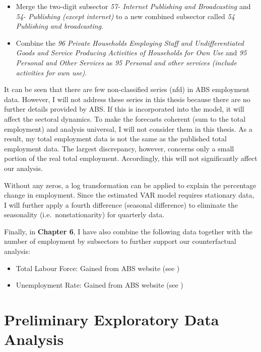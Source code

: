 \documentclass{monashthesis}
\begin{document}
\begin{itemize}
\item
  Merge the two-digit subsector \emph{57- Internet Publishing and Broadcasting} and \emph{54- Publishing (except internet)} to a new combined subsector called \emph{54 Publishing and broadcasting}.
\item
  Combine the \emph{96 Private Households Employing Staff and Undifferentiated Goods and Service Producing Activities of Households for Own Use} and \emph{95 Personal and Other Services} as \emph{95 Personal and other services (include activities for own use)}.
\end{itemize}

It can be seen that there are few non-classified series (nfd) in ABS employment data. However, I will not address these series in this thesis because there are no further details provided by ABS. If this is incorporated into the model, it will affect the sectoral dynamics. To make the forecasts coherent (sum to the total employment) and analysis universal, I will not consider them in this thesis. As a result, my total employment data is not the same as the published total employment data. The largest discrepancy, however, concerns only a small portion of the real total employment. Accordingly, this will not significantly affect our analysis.

Without any zeros, a log transformation can be applied to explain the percentage change in employment. Since the estimated VAR model requires stationary data, I will further apply a fourth difference (seasonal difference) to eliminate the seasonality (i.e.~nonstationarity) for quarterly data.

Finally, in \textbf{Chapter 6}, I have also combine the following data together with the number of employment by subsectors \autocite{ABS2022} to further support our counterfactual analysis:

\begin{itemize}
\item
  Total Labour Force: Gained from ABS website (see \textcite{ABS2022})
\item
  Unemployment Rate: Gained from ABS website (see \textcite{ABS2022a})
\end{itemize}

\hypertarget{preliminary-exploratory-data-analysis}{%
\section{Preliminary Exploratory Data Analysis}\label{preliminary-exploratory-data-analysis}}
\end{document}
